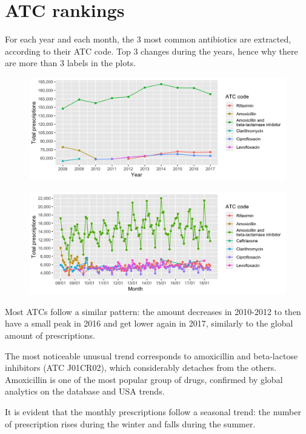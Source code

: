 \section{ATC rankings}
For each year and each month, the 3 most common antibiotics are extracted, according to their ATC code. Top 3 changes during the years, hence why there are more than 3 labels in the plots. 
\begin{figure}[h]
	\centering
	\includegraphics[scale=0.3]{../plots/top_atc-year.png}
\end{figure}

\begin{figure}[h]
	\centering
	\includegraphics[scale=0.3]{../plots/top_atc-month.png}
\end{figure}

Most ATCs follow a similar pattern: the amount decreases in 2010-2012 to then have a small peak in 2016 and get lower again in 2017, similarly to the global amount of prescriptions.

The most noticeable unusual trend corresponds to amoxicillin and beta-lactose inhibitors (ATC J01CR02), which considerably detaches from the others. Amoxicillin is one of the most popular group of drugs, confirmed by global analytics on the database and USA trends\cite{usa}.

It is evident that the monthly prescriptions follow a seasonal trend: the number of prescription rises during the winter and falls during the summer.

